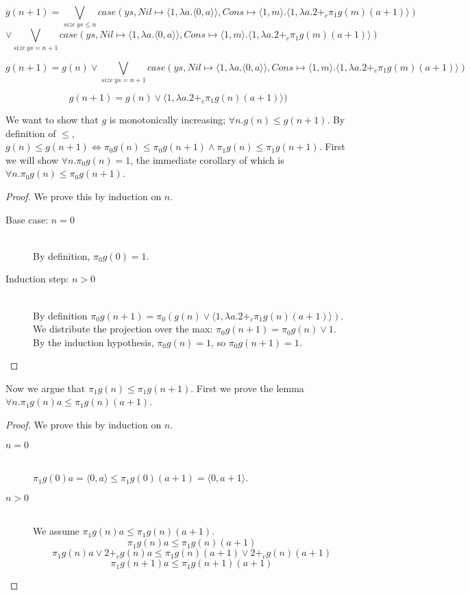\[ g(n+1) = \bigvee_{size\ ys \leq n} case(ys, Nil \mapsto \langle1,\lambda a.\langle 0,a\rangle\rangle, Cons \mapsto \langle 1,m \rangle.\langle 1, \lambda a. 2 +_c \pi_1g(m) (a+1)\rangle) \]
\[ \vee \bigvee_{size\ ys = n+1} case(ys, Nil \mapsto \langle1,\lambda a.\langle 0,a\rangle\rangle, Cons \mapsto \langle 1,m \rangle.\langle 1, \lambda a. 2 +_c \pi_1g(m) (a+1)\rangle) \]
 
\[ g(n+1) = g(n) \vee \bigvee_{size\ ys = n+1} case(ys, Nil \mapsto \langle1,\lambda a.\langle 0,a\rangle\rangle, Cons \mapsto \langle 1,m \rangle.\langle 1, \lambda a. 2 +_c \pi_1g(m) (a+1)\rangle) \]

\[ g(n+1) = g(n) \vee \langle 1, \lambda a. 2 +_c \pi_1g(n) (a+1)\rangle)\]

We want to show that $g$ is monotonically increasing; $\forall n.g(n) \leq g(n+1)$.
By definition of $\leq$, $g(n) \leq g(n+1) \Leftrightarrow \pi_0 g(n) \leq \pi_0 g(n+1) \land \pi_1 g(n) \leq \pi_1 g(n+1)$.
First we will show $\forall n. \pi_0 g(n) = 1$, the immediate corollary of which is $\forall n. \pi_0 g(n) \leq \pi_0 g(n+1)$.
\begin{proof}
We prove this by induction on $n$.
  \begin{description}
    \item[Base case: $n=0$]\hfill \\
      By definition, $\pi_0 g(0) = 1$.
    \item[Induction step: $n>0$]\hfill \\
      By definition $\pi_0 g(n+1) = \pi_0 (g(n) \vee \langle 1, \lambda a. 2 +_c \pi_1g(n) (a+1)\rangle)$.
      We distribute the projection over the max: $\pi_0 g(n+1) = \pi_0 g(n) \vee 1$.
      By the induction hypothesis, $\pi_0 g(n) = 1$, so $\pi_0 g(n+1) = 1$.
  \end{description}
\end{proof}
Now we argue that $\pi_1g(n) \leq \pi_1 g(n+1)$.
First we prove the lemma $\forall n.\pi_1 g(n) a \leq \pi_1 g(n) (a+1)$.
\begin{proof}
  We prove this by induction on $n$.
  \begin{description}
    \item[$n=0$]\hfill \\
      $\pi_1 g(0) a = \langle 0,a\rangle \leq \pi_1 g(0) (a+1) = \langle 0,a+1 \rangle$.
    \item[$n>0$]\hfill \\
      We assume $\pi_1 g(n) a \leq \pi_1 g(n) (a+1)$.
      \[ \pi_1 g(n) a \leq \pi_1 g(n) (a+1) \]
      \[ \pi_1 g(n) a \vee 2 +_c g(n) a \leq \pi_1 g(n) (a+1) \vee 2 +_c g(n) (a+1) \]
      \[ \pi_1 g(n+1) a \leq \pi_1 g(n+1) (a+1) \]
  \end{description}
\end{proof}


